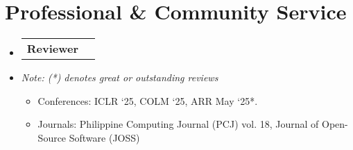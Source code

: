 \documentclass[a4paper,11pt]{article}
\makeatletter
\newcommand{\resumeItem}[1]{
  \item\small{
    {#1 \vspace{-2pt}}
  }
}
\newcommand{\resumeProjectHeading}[2]{
    \item
    \begin{tabular*}{0.97\textwidth}{l@{\extracolsep{\fill}}r}
      \small#1 & #2 \\
    \end{tabular*}\vspace{-7pt}
}
\newcommand{\resumeSubHeadingListStart}{\begin{itemize}[leftmargin=0.15in, label={}]}
\newcommand{\resumeSubHeadingListEnd}{\end{itemize}}
\newcommand{\resumeItemListStart}{\begin{itemize}}
\newcommand{\resumeItemListEnd}{\end{itemize}\vspace{-5pt}}
\makeatother
\begin{document}

\section{Professional \& Community Service}
\resumeSubHeadingListStart

\resumeProjectHeading
{\textbf{Reviewer}}{}
\resumeItem{\textit{Note: (*) denotes great or outstanding reviews}}
\resumeItemListStart
\resumeItem{Conferences: ICLR `25, COLM `25, ARR May `25*.}
\resumeItem{Journals: Philippine Computing Journal (PCJ) vol. 18, Journal of Open-Source Software (JOSS)}
\resumeItemListEnd

\resumeSubHeadingListEnd
\end{document}
